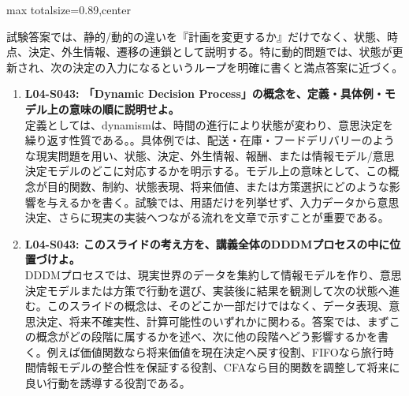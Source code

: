 \begin{minipage}[t]{0.58\textwidth}
\begin{adjustbox}{max totalsize={\textwidth}{0.89\textheight},center}
\begin{minipage}{\textwidth}
試験答案では、静的/動的の違いを『計画を変更するか』だけでなく、状態、時点、決定、外生情報、遷移の連鎖として説明する。特に動的問題では、状態が更新され、次の決定の入力になるというループを明確に書くと満点答案に近づく。\par{}\begin{enumerate}\item \textbf{L04-S043: 「Dynamic Decision Process」の概念を、定義・具体例・モデル上の意味の順に説明せよ。}\\定義としては、dynamismは、時間の進行により状態が変わり、意思決定を繰り返す性質である。。具体例では、配送・在庫・フードデリバリーのような現実問題を用い、状態、決定、外生情報、報酬、または情報モデル/意思決定モデルのどこに対応するかを明示する。モデル上の意味として、この概念が目的関数、制約、状態表現、将来価値、または方策選択にどのような影響を与えるかを書く。試験では、用語だけを列挙せず、入力データから意思決定、さらに現実の実装へつながる流れを文章で示すことが重要である。\item \textbf{L04-S043: このスライドの考え方を、講義全体のDDDMプロセスの中に位置づけよ。}\\DDDMプロセスでは、現実世界のデータを集約して情報モデルを作り、意思決定モデルまたは方策で行動を選び、実装後に結果を観測して次の状態へ進む。このスライドの概念は、そのどこか一部だけではなく、データ表現、意思決定、将来不確実性、計算可能性のいずれかに関わる。答案では、まずこの概念がどの段階に属するかを述べ、次に他の段階へどう影響するかを書く。例えば価値関数なら将来価値を現在決定へ戻す役割、FIFOなら旅行時間情報モデルの整合性を保証する役割、CFAなら目的関数を調整して将来に良い行動を誘導する役割である。\end{enumerate}
\end{minipage}
\end{adjustbox}
\end{minipage}


